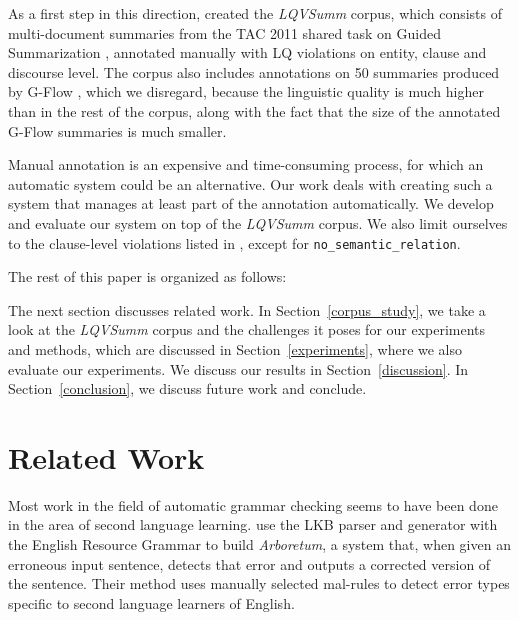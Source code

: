 \documentclass[a4paper,10pt]{scrartcl}
\theoremstyle{style}
\begin{document}
As a first step in this direction, \cite{friedrichlqvsumm} created the \textit{LQVSumm} corpus, which consists of multi-document summaries from the TAC 2011 shared task on Guided Summarization \citep{owczarzak2011overview}, annotated manually with LQ violations on entity, clause and discourse level. The corpus also includes annotations on 50 summaries produced by G-Flow \citep{gflow}, which we disregard, because the linguistic quality is much higher than in the rest of the corpus, along with the fact that the size of the annotated G-Flow summaries is much smaller.

Manual annotation is an expensive and time-consuming process, for which an automatic system could be an alternative. Our work deals with creating such a system that manages at least part of the annotation automatically. We develop and evaluate our system on top of the \textit{LQVSumm} corpus. We also limit ourselves to the clause-level violations listed in \cite{friedrichlqvsumm}, except for \texttt{no\_semantic\_relation}.

The rest of this paper is organized as follows:

The next section discusses related work. In Section~\ref{corpus_study}, we take a look at the \textit{LQVSumm} corpus and the challenges it poses for our experiments and methods, which are discussed in Section~\ref{experiments}, where we also evaluate our experiments. We discuss our results in Section~\ref{discussion}. In Section~\ref{conclusion}, we discuss future work and conclude.

\section{Related Work}
\label{related_work}


Most work in the field of automatic grammar checking seems to have been done in the area of second language learning.
\cite{bender2004arboretum} use the LKB parser and generator \cite{copestake2002implementing} with the English Resource Grammar \citep{flickinger2000building} to build \textit{Arboretum}, a system that, when given an erroneous input sentence, detects that error and outputs a corrected version of the sentence. Their method uses manually selected mal-rules \citep{schneider1998recognizing} to detect error types specific to second language learners of English.
\end{document}
